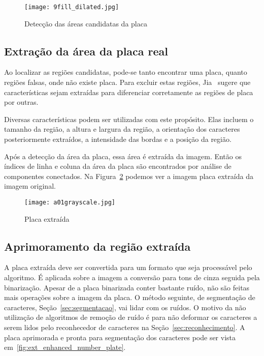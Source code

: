\begin{figure}[H]
	\centering
	\texttt{[image: 9fill\_dilated.jpg]}
	\caption{Detecção das áreas candidatas da placa}
	\label{fig:ext_plate_area_detection}
\end{figure}

\subsection{Extração da área da placa real}

Ao localizar as regiões candidatas, pode-se tanto encontrar uma placa, quanto regiões falsas, onde não existe placa. Para excluir estas regiões, Jia~\cite{jia2007region} sugere que características sejam extraídas para diferenciar corretamente as regiões de placa por outras. 

Diversas características podem ser utilizadas com este propósito. Elas incluem o tamanho da região, a altura e largura da região, a orientação dos caracteres posteriormente extraídos, a intensidade das bordas e a posição da região. 
 
Após a detecção da área da placa, essa área é extraída da imagem. Então os índices de linha e coluna da área da placa são encontrados por análise de componentes conectados. Na Figura~\ref{fig:ext_true_number_plate} podemos ver a imagem placa extraída da imagem original.

\begin{figure}[H]
	\centering
	\texttt{[image: a01grayscale.jpg]}
	\caption{Placa extraída}
	\label{fig:ext_true_number_plate}
\end{figure}

\subsection{Aprimoramento da região extraída}

A placa extraída deve ser convertida para um formato que seja processável pelo algoritmo. É aplicada sobre a imagem a conversão para tons de cinza seguida pela binarização. Apesar de a placa binarizada conter bastante ruído, não são feitas mais operações sobre a imagem da placa. O método seguinte, de segmentação de caracteres, Seção~\ref{sec:segmentacao}, vai lidar com os ruídos. O motivo da não utilização de algoritmos de remoção de ruído é para não deformar os caracteres a serem lidos pelo reconhecedor de caracteres na Seção~\ref{sec:reconhecimento}. A placa aprimorada e pronta para segmentação dos caracteres pode ser vista em~\ref{fig:ext_enhanced_number_plate}.

